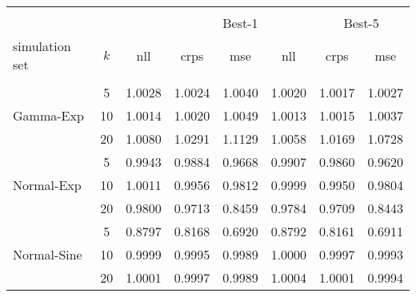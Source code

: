 \begin{table}[ht]
\centering
\begin{tabular}{lccccccc}
\hline  \\[-1em]
& & &\multicolumn{3}{c}{Best-1} & \multicolumn{3}{c}{Best-5} \\[0.1em]
simulation set & $k$ & nll & crps & mse & nll & crps & mse \\[0.1em]
  \hline\hline \\[-0.8em]
          &5& 1.0028 & 1.0024 & 1.0040 & 1.0020 & 1.0017 & 1.0027 \\
Gamma-Exp &10& 1.0014 & 1.0020 & 1.0049 & 1.0013 & 1.0015 & 1.0037 \\ 
           &20& 1.0080 & 1.0291 & 1.1129 & 1.0058 & 1.0169 & 1.0728 \\
           &5& 0.9943 & 0.9884 & 0.9668 & 0.9907 & 0.9860 & 0.9620 \\ 
Normal-Exp &10& 1.0011 & 0.9956 & 0.9812 & 0.9999 & 0.9950 & 0.9804 \\ 
           &20& 0.9800 & 0.9713 & 0.8459 & 0.9784 & 0.9709 & 0.8443 \\
           &5& 0.8797 & 0.8168 & 0.6920 & 0.8792 & 0.8161 & 0.6911 \\  
Normal-Sine &10& 0.9999 & 0.9995 & 0.9989 & 1.0000 & 0.9997 & 0.9993 \\ 
             &20& 1.0001 & 0.9997 & 0.9989 & 1.0004 & 1.0001 & 0.9994 \\ 
   \hline
\end{tabular}
\end{table}
